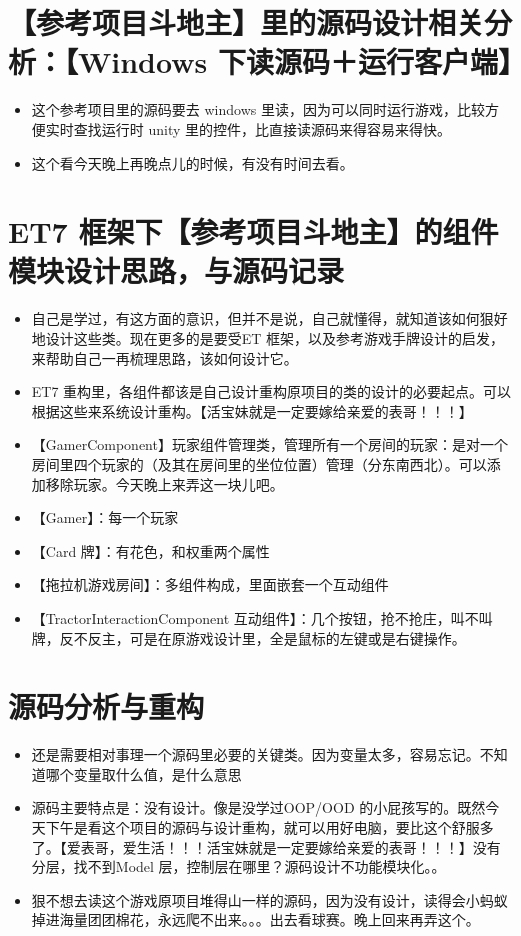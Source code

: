 \documentclass[9pt, b5paper]{article}
\begin{document}
\subsection{}
\label{sec-3-7}

\section{【参考项目斗地主】里的源码设计相关分析：【Windows 下读源码＋运行客户端】}
\label{sec-4}
\begin{itemize}
\item 这个参考项目里的源码要去 windows 里读，因为可以同时运行游戏，比较方便实时查找运行时 unity 里的控件，比直接读源码来得容易来得快。
\item 这个看今天晚上再晚点儿的时候，有没有时间去看。
\end{itemize}

\section{ET7 框架下【参考项目斗地主】的组件模块设计思路，与源码记录}
\label{sec-5}
\begin{itemize}
\item 自己是学过，有这方面的意识，但并不是说，自己就懂得，就知道该如何狠好地设计这些类。现在更多的是要受ET 框架，以及参考游戏手牌设计的启发，来帮助自己一再梳理思路，该如何设计它。
\item ET7 重构里，各组件都该是自己设计重构原项目的类的设计的必要起点。可以根据这些来系统设计重构。【活宝妹就是一定要嫁给亲爱的表哥！！！】
\item 【GamerComponent】玩家组件管理类，管理所有一个房间的玩家：是对一个房间里四个玩家的（及其在房间里的坐位位置）管理（分东南西北）。可以添加移除玩家。今天晚上来弄这一块儿吧。
\item 【Gamer】：每一个玩家
\item 【Card 牌】：有花色，和权重两个属性
\item 【拖拉机游戏房间】：多组件构成，里面嵌套一个互动组件
\item 【TractorInteractionComponent 互动组件】：几个按钮，抢不抢庄，叫不叫牌，反不反主，可是在原游戏设计里，全是鼠标的左键或是右键操作。
\end{itemize}
\section{源码分析与重构}
\label{sec-6}
\begin{itemize}
\item 还是需要相对事理一个源码里必要的关键类。因为变量太多，容易忘记。不知道哪个变量取什么值，是什么意思
\item 源码主要特点是：没有设计。像是没学过OOP/OOD 的小屁孩写的。既然今天下午是看这个项目的源码与设计重构，就可以用好电脑，要比这个舒服多了。【爱表哥，爱生活！！！活宝妹就是一定要嫁给亲爱的表哥！！！】没有分层，找不到Model 层，控制层在哪里？源码设计不功能模块化。。
\item 狠不想去读这个游戏原项目堆得山一样的源码，因为没有设计，读得会小蚂蚁掉进海量团团棉花，永远爬不出来。。。出去看球赛。晚上回来再弄这个。
\end{itemize}
\end{document}
